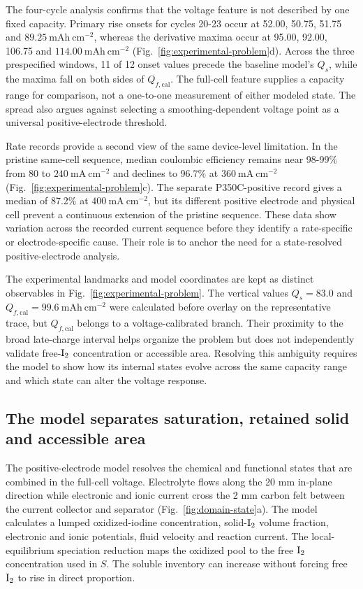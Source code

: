\documentclass[11pt]{article}
\begin{document}
The four-cycle analysis confirms that the voltage feature is not described by one fixed capacity. Primary rise onsets for cycles 20-23 occur at 52.00, 50.75, 51.75 and $89.25~\mathrm{mAh~cm^{-2}}$, whereas the derivative maxima occur at 95.00, 92.00, 106.75 and $114.00~\mathrm{mAh~cm^{-2}}$ (Fig.~\ref{fig:experimental-problem}d). Across the three prespecified windows, 11 of 12 onset values precede the baseline model's $Q_s$, while the maxima fall on both sides of $Q_{f,\mathrm{cal}}$. The full-cell feature supplies a capacity range for comparison, not a one-to-one measurement of either modeled state. The spread also argues against selecting a smoothing-dependent voltage point as a universal positive-electrode threshold.

Rate records provide a second view of the same device-level limitation. In the pristine same-cell sequence, median coulombic efficiency remains near 98-99\% from 80 to $240~\mathrm{mA~cm^{-2}}$ and declines to 96.7\% at $360~\mathrm{mA~cm^{-2}}$ (Fig.~\ref{fig:experimental-problem}c). The separate P350C-positive record gives a median of 87.2\% at $400~\mathrm{mA~cm^{-2}}$, but its different positive electrode and physical cell prevent a continuous extension of the pristine sequence. These data show variation across the recorded current sequence before they identify a rate-specific or electrode-specific cause. Their role is to anchor the need for a state-resolved positive-electrode analysis.

The experimental landmarks and model coordinates are kept as distinct observables in Fig.~\ref{fig:experimental-problem}. The vertical values $Q_s=83.0$ and $Q_{f,\mathrm{cal}}=99.6~\mathrm{mAh~cm^{-2}}$ were calculated before overlay on the representative trace, but $Q_{f,\mathrm{cal}}$ belongs to a voltage-calibrated branch. Their proximity to the broad late-charge interval helps organize the problem but does not independently validate free-$\ce{I2}$ concentration or accessible area. Resolving this ambiguity requires the model to show how its internal states evolve across the same capacity range and which state can alter the voltage response.

\subsection{The model separates saturation, retained solid and accessible area}


The positive-electrode model resolves the chemical and functional states that are combined in the full-cell voltage. Electrolyte flows along the 20 mm in-plane direction while electronic and ionic current cross the 2 mm carbon felt between the current collector and separator (Fig.~\ref{fig:domain-state}a). The model calculates a lumped oxidized-iodine concentration, solid-$\ce{I2}$ volume fraction, electronic and ionic potentials, fluid velocity and reaction current. The local-equilibrium speciation reduction maps the oxidized pool to the free $\ce{I2}$ concentration used in $S$. The soluble inventory can increase without forcing free $\ce{I2}$ to rise in direct proportion.
\end{document}
